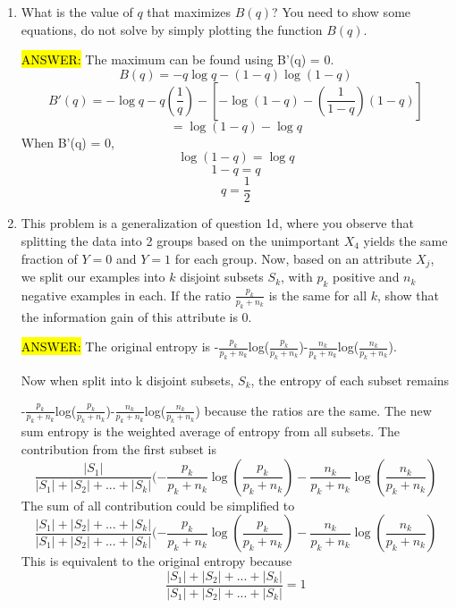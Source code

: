 \documentclass[11pt]{article}
\begin{document}
\begin{enumerate}
	
\item {} What is the value of $q$ that maximizes $B(q)$? You need to show some equations, do not solve by simply plotting the function $B(q)$.

\hl{ANSWER:} The maximum can be found using B'(q) = 0.
\begin{equation*}
B(q) = - q \log q - (1 - q) \log(1 - q)
\end{equation*}
\begin{equation*}
B'(q) = - \log q -q(\frac{1}{q}) - [- \log(1 - q) -(\frac{1}{1 - q})(1 - q)]
\end{equation*}
\begin{equation*}
    = \log (1 - q) - \log q
\end{equation*}
When B'(q) = 0,
\begin{equation*}
\log (1 - q) = \log q
\end{equation*}
\begin{equation*}
1 - q = q
\end{equation*}
\begin{equation*}
q = \frac{1}{2}
\end{equation*}

\item {} This problem is a generalization of question 1d, where you observe that splitting the data into 2 groups based on the unimportant $X_4$ yields the same fraction of $Y=0$ and $Y=1$ for each group. Now, based on an attribute $X_j$, we split our examples into $k$ disjoint subsets $S_k$, with $p_k$ positive and $n_k$ negative examples in each. If the ratio $\tfrac{p_k}{p_k + n_k}$ is the same for all $k$, show that the information gain of this attribute is 0.

\hl{ANSWER:} The original entropy is -$\tfrac{p_k}{p_k + n_k}$log($\tfrac{p_k}{p_k + n_k}$)-$\tfrac{n_k}{p_k + n_k}$log($\tfrac{n_k}{p_k + n_k}$).

Now when split into k disjoint subsets, $S_k$, the entropy of each subset remains 

-$\tfrac{p_k}{p_k + n_k}$log($\tfrac{p_k}{p_k + n_k}$)-$\tfrac{n_k}{p_k + n_k}$log($\tfrac{n_k}{p_k + n_k}$) because the ratios are the same.
The new sum entropy is the weighted average of entropy from all subsets.
The contribution from the first subset is
\begin{equation*}
\frac{|S_1|}{|S_1|+|S_2|+...+|S_k|}(-\frac{p_k}{p_k + n_k}\log(\frac{p_k}{p_k + n_k}) - \frac{n_k}{p_k + n_k}\log(\frac{n_k}{p_k + n_k})
\end{equation*}
The sum of all contribution could be simplified to
\begin{equation*}
\frac{|S_1|+|S_2|+...+|S_k|}{|S_1|+|S_2|+...+|S_k|}(-\frac{p_k}{p_k + n_k}\log(\frac{p_k}{p_k + n_k}) - \frac{n_k}{p_k + n_k}\log(\frac{n_k}{p_k + n_k})
\end{equation*}
This is equivalent to the original entropy because
\begin{equation*}
\frac{|S_1|+|S_2|+...+|S_k|}{|S_1|+|S_2|+...+|S_k|} = 1
\end{equation*}


\end{enumerate}
\end{document}
